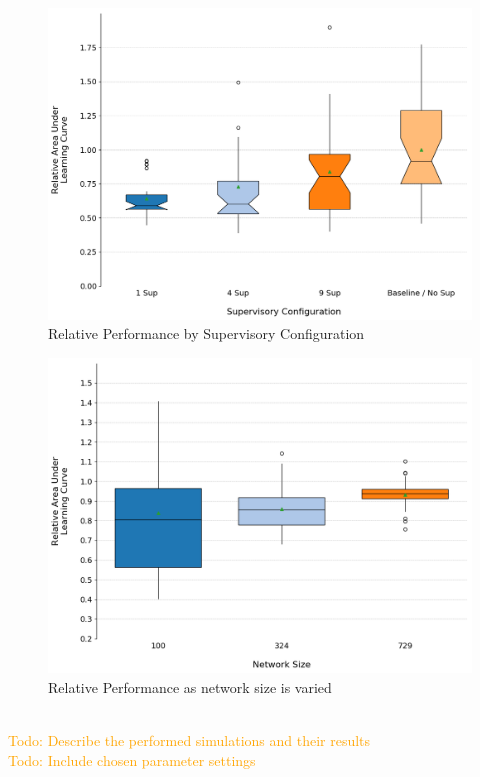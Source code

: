 \documentclass[letterpaper]{article}
\newcommand\todo[1]{\textcolor{orange}{Todo: #1}}
\begin{document}
\begin{figure}[ht]
 \begin{center}
  \includegraphics[width=\linewidth]{figures/figure7}
  \caption{Relative Performance by Supervisory Configuration}
  \label{fig:sups}
 \end{center}
\end{figure}
\begin{figure}[ht]
 \begin{center}
  \includegraphics[width=\linewidth]{figures/figure8}
  \caption{Relative Performance as network size is varied}
  \label{fig:sizes}
 \end{center}
\end{figure}
\\\todo{Describe the performed simulations and their results}
\\\todo{Include chosen parameter settings}
\end{document}
